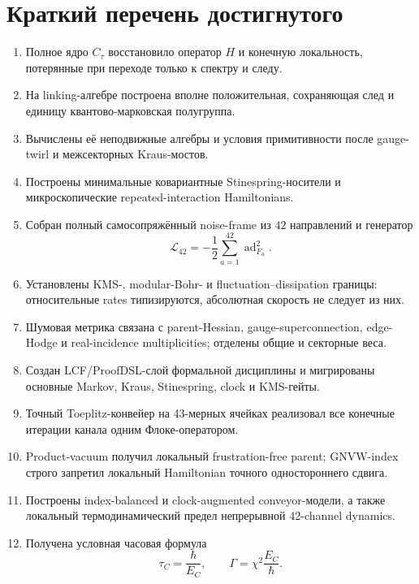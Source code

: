 \section{Краткий перечень достигнутого}

\begin{enumerate}
 \item Полное ядро $C_\tau$ восстановило оператор $H$ и конечную локальность,
 потерянные при переходе только к спектру и следу.
 \item На linking-алгебре построена вполне положительная, сохраняющая след и
 единицу квантово-марковская полугруппа.
 \item Вычислены её неподвижные алгебры и условия примитивности после
 gauge-twirl и межсекторных Kraus-мостов.
 \item Построены минимальные ковариантные Stinespring-носители и
 микроскопические repeated-interaction Hamiltonians.
 \item Собран полный самосопряжённый noise-frame из $42$ направлений и
 генератор
 \begin{equation}
  \mathcal L_{42}=-\frac12\sum_{a=1}^{42}\operatorname{ad}_{F_a}^2.
  \label{eq:v8-final-generator}
 \end{equation}
 \item Установлены KMS-, modular-Bohr- и fluctuation--dissipation границы:
 относительные rates типизируются, абсолютная скорость не следует из них.
 \item Шумовая метрика связана с parent-Hessian, gauge-superconnection,
 edge-Hodge и real-incidence multiplicities; отделены общие и секторные
 веса.
 \item Создан LCF/ProofDSL-слой формальной дисциплины и мигрированы основные
 Markov, Kraus, Stinespring, clock и KMS-гейты.
 \item Точный Toeplitz-конвейер на 43-мерных ячейках реализовал все конечные
 итерации канала одним Флоке-оператором.
 \item Product-vacuum получил локальный frustration-free parent; GNVW-index
 строго запретил локальный Hamiltonian точного одностороннего сдвига.
 \item Построены index-balanced и clock-augmented conveyor-модели, а также
 локальный термодинамический предел непрерывной 42-channel dynamics.
 \item Получена условная часовая формула
 \begin{equation}
  \tau_C=\frac{\hbar}{E_C},\qquad
  \Gamma=\chi^2\frac{E_C}{\hbar}.
  \label{eq:v8-final-clock-rate}
 \end{equation}

\end{enumerate}
